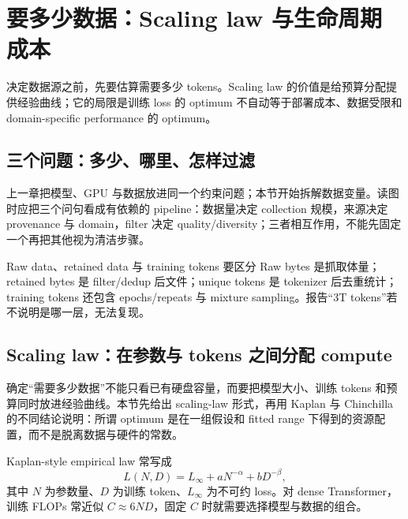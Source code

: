 \section{要多少数据：Scaling law 与生命周期成本}

决定数据源之前，先要估算需要多少 tokens。Scaling law 的价值是给预算分配提供经验曲线；它的局限是训练 loss 的 optimum 不自动等于部署成本、数据受限和 domain-specific performance 的 optimum。

\subsection{三个问题：多少、哪里、怎样过滤}

上一章把模型、GPU 与数据放进同一个约束问题；本节开始拆解数据变量。读图时应把三个问句看成有依赖的 pipeline：数据量决定 collection 规模，来源决定 provenance 与 domain，filter 决定 quality/diversity；三者相互作用，不能先固定一个再把其他视为清洁步骤。


\begin{importantbox}{Raw data、retained data 与 training tokens 要区分}
Raw bytes 是抓取体量；retained bytes 是 filter/dedup 后文件；unique tokens 是 tokenizer 后去重统计；training tokens 还包含 epochs/repeats 与 mixture sampling。报告“3T tokens”若不说明是哪一层，无法复现。
\end{importantbox}

\subsection{Scaling law：在参数与 tokens 之间分配 compute}

确定“需要多少数据”不能只看已有硬盘容量，而要把模型大小、训练 tokens 和预算同时放进经验曲线。本节先给出 scaling-law 形式，再用 Kaplan 与 Chinchilla 的不同结论说明：所谓 optimum 是在一组假设和 fitted range 下得到的资源配置，而不是脱离数据与硬件的常数。

Kaplan-style empirical law 常写成
\[
L(N,D)=L_\infty+aN^{-\alpha}+bD^{-\beta},
\]
其中 $N$ 为参数量、$D$ 为训练 token、$L_\infty$ 为不可约 loss。对 dense Transformer，训练 FLOPs 常近似 $C\approx 6ND$，固定 $C$ 时就需要选择模型与数据的组合。




